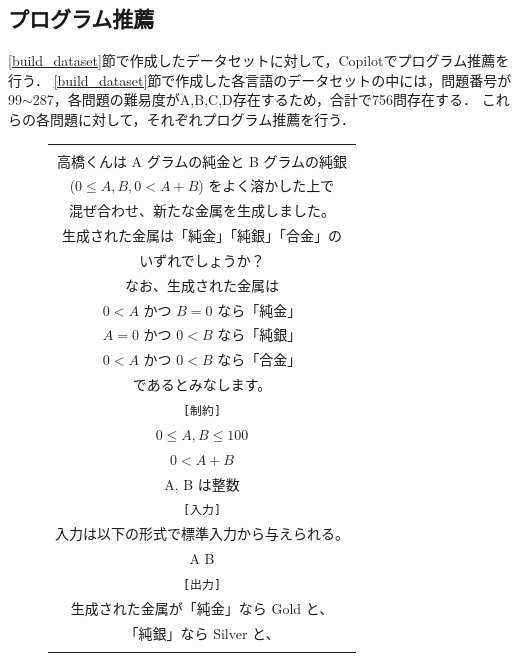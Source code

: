   \subsection{プログラム推薦\label{recommend_program}}
    \ref{build_dataset}節で作成したデータセットに対して，Copilotでプログラム推薦を行う．
    \ref{build_dataset}節で作成した各言語のデータセットの中には，問題番号が99${\sim}$287，各問題の難易度がA,B,C,D存在するため，合計で756問存在する．
    これらの各問題に対して，それぞれプログラム推薦を行う．
    
    \begin{figure}[t]
      \begin{tabular}{c}
        \begin{tabularx}{23zw}{l}
          \hline
          \verb|[問題文]| \\
          \textrm{  高橋くんは A グラムの純金と B グラムの純銀} \\
          \textrm{  ($0 \leq A, B, 0 < A+B$) をよく溶かした上で} \\
          \textrm{  混ぜ合わせ、新たな金属を生成しました。} \\
          \textrm{  生成された金属は「純金」「純銀」「合金」の} \\
          \textrm{  いずれでしょうか？} \\
          \textrm{  なお、生成された金属は} \\
          \textrm{  $0 < A$ かつ $B = 0$ なら「純金」} \\
          \textrm{  $A = 0$ かつ $0 < B$ なら「純銀」} \\
          \textrm{  $0 < A$ かつ $0 < B$ なら「合金」} \\
          \textrm{  であるとみなします。} \\
          \verb|[制約]| \\
          \textrm{  $0 \leq A,B \leq 100$} \\
          \textrm{  $0 < A+B$} \\
          \textrm{  A, B は整数} \\
          \verb|[入力]| \\
          \textrm{  入力は以下の形式で標準入力から与えられる。} \\
          \textrm{  A B} \\
          \verb|[出力]| \\
          \textrm{  生成された金属が「純金」なら Gold と、} \\
          \textrm{  「純銀」なら Silver と、} \\

\end{tabularx}
\end{tabular}
\end{figure}
